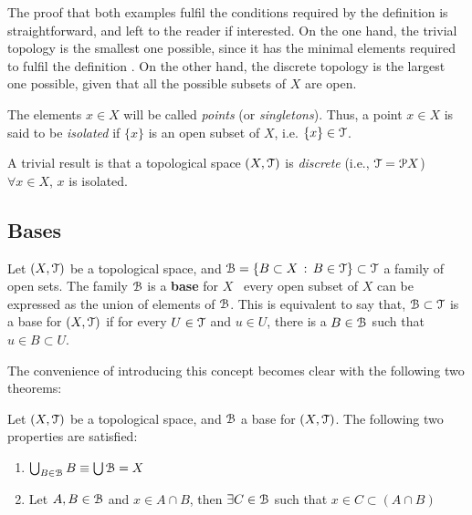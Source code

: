 The proof that both examples fulfil the conditions required by the definition
 is straightforward, and left to the reader if interested.
On the one hand, the trivial topology is the smallest one possible, since it has the
minimal elements required to fulfil the definition .
On the other hand, the discrete topology is the largest one possible, given that all
the possible subsets of $X$ are open.

\begin{definition}
	The elements $x\in X$ will be called \emph{points} (or \emph{singletons}).
	Thus, a point $x\in X$ is said to be \emph{isolated} if $\{x\}$ is an open subset
	of $X$, i.e. $\{x\}\in \EuScript{T}$.
\end{definition}

\begin{remark}
	A trivial result is that a topological space $(X,\EuScript{T})$ is \emph{discrete} (i.e.,
	$\EuScript{T}=\EuScript{P} X$) \iff\ $\forall x\in X$, $x$ is isolated.
\end{remark}

\subsection{Bases}\label{subsec:bases}

\begin{definition}
	\label{def:base}
	Let $(X, \EuScript{T})$ be a topological space, and $\EuScript{B} = \{B \subset X\,:\, B \in \EuScript{T}\}\subset\EuScript{T}$
	a family of open sets.
	The family $\EuScript{B}$ is a \textbf{base} for $X$ \iff\, every open subset of $X$ can be
	expressed as the union of elements of $\EuScript{B}$.
	This is equivalent to say that, $\EuScript{B}\subset\EuScript{T}$ is a base for $(X,\EuScript{T})$ if for every $U\in\EuScript{T}$ and $u\in U$, there is a $B\in \EuScript{B}$ such that
	$u\in B\subset U$.
\end{definition}

The convenience of introducing this concept becomes clear with the following two theorems:

\begin{theorem}
	\label{th:base-properties}
	Let $(X, \EuScript{T})$ be a topological space, and $\EuScript{B}$ a base for $(X, \EuScript{T})$.
	The following two properties are satisfied:
	\begin{enumerate}
		\item $\bigcup_{B\in\EuScript{B}} B \equiv \bigcup\EuScript{B} = X$
		\item Let $A, B\in \EuScript{B}$ and $x\in A\cap B$, then $\exists C\in \EuScript{B}$ such
		that $x\in C\subset (A\cap B)$
	\end{enumerate}
\end{theorem}

